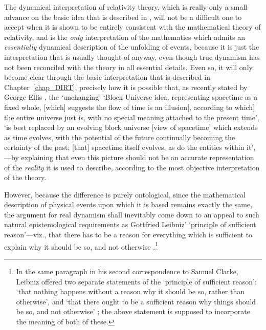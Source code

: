 The dynamical interpretation of relativity theory, which is really only a small advance on the basic idea that is described in \cite{Geroch1970}, will not be a difficult one to accept when it is shown to be entirely consistent with the mathematical theory of relativity, and is the \textit{only} interpretation of the mathematics which admits an \textit{essentially} dynamical description of the unfolding of events, because it is just the interpretation that is usually thought of anyway, even though true dynamism has not been reconciled with the theory in all essential details. Even so, it will only become clear through the basic interpretation that is described in Chapter~\ref{chap_DIRT}, precisely how it is possible that, as recently stated by George Ellis \cite{Ellis2007}, the `unchanging' `Block Universe idea, representing spacetime as a fixed whole, [which] suggests the flow of time is an illusion[, according to which] the entire universe just is, with no special meaning attached to the present time', `is best replaced by an evolving block universe [view of spacetime] which extends as time evolves, with the potential of the future continually becoming the certainty of the past; [that] spacetime itself evolves, as do the entities within it',---by explaining that even this picture should not be an accurate representation of the \textit{reality} it is used to describe, according to the most objective interpretation of the theory.

However, because the difference is purely ontological, since the mathematical description of physical events upon which it is based remains exactly the same, the argument for real dynamism shall inevitably come down to an appeal to such natural epistemological requirements as Gottfried Leibniz' `principle of sufficient reason'---viz., that there has to be a reason for everything which is sufficient to explain why it should be so, and not otherwise \cite{Leibniz1956}.\footnote{In the same paragraph in his second correspondence to Samuel Clarke, Leibniz offered two separate statements of the `principle of sufficient reason': `that nothing happens without a reason why it should be so, rather than otherwise', and `that there ought to be a sufficient reason why things should be so, and not otherwise' \cite{Leibniz1956}; the above statement is supposed to incorporate the meaning of both of these.}

